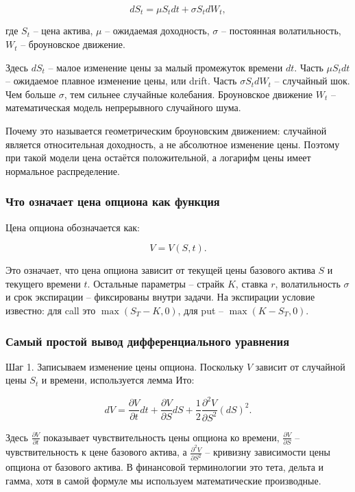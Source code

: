\documentclass[11pt,a4paper]{article}
\begin{document}
\begin{equation}
dS_t = \mu S_t dt + \sigma S_t dW_t,
\end{equation}

где $S_t$ -- цена актива, $\mu$ -- ожидаемая доходность, $\sigma$ -- постоянная волатильность, $W_t$ -- броуновское движение.

Здесь $dS_t$ -- малое изменение цены за малый промежуток времени $dt$. Часть $\mu S_tdt$ -- ожидаемое плавное изменение цены, или drift. Часть $\sigma S_tdW_t$ -- случайный шок. Чем больше $\sigma$, тем сильнее случайные колебания. Броуновское движение $W_t$ -- математическая модель непрерывного случайного шума.

Почему это называется геометрическим броуновским движением: случайной является относительная доходность, а не абсолютное изменение цены. Поэтому при такой модели цена остаётся положительной, а логарифм цены имеет нормальное распределение.

\subsubsection{Что означает цена опциона как функция}

Цена опциона обозначается как:

\begin{equation}
V=V(S,t).
\end{equation}

Это означает, что цена опциона зависит от текущей цены базового актива $S$ и текущего времени $t$. Остальные параметры -- страйк $K$, ставка $r$, волатильность $\sigma$ и срок экспирации -- фиксированы внутри задачи. На экспирации условие известно: для call это $\max(S_T-K,0)$, для put -- $\max(K-S_T,0)$.

\subsubsection{Самый простой вывод дифференциального уравнения}

Шаг 1. Записываем изменение цены опциона. Поскольку $V$ зависит от случайной цены $S_t$ и времени, используется лемма Ито:

\begin{equation}
dV =
\frac{\partial V}{\partial t}dt
+
\frac{\partial V}{\partial S}dS
+
\frac{1}{2}
\frac{\partial^2 V}{\partial S^2}
(dS)^2.
\end{equation}

Здесь $\frac{\partial V}{\partial t}$ показывает чувствительность цены опциона ко времени, $\frac{\partial V}{\partial S}$ -- чувствительность к цене базового актива, а $\frac{\partial^2V}{\partial S^2}$ -- кривизну зависимости цены опциона от базового актива. В финансовой терминологии это тета, дельта и гамма, хотя в самой формуле мы используем математические производные.
\end{document}
